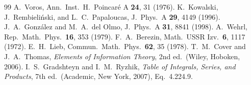 \documentclass[pra,twocolumn,superscriptaddress,longbibliography,floatfix]{revtex4-2}
\begin{document}
\begin{thebibliography}{99}
 A.~Voros, Ann.\ Inst.\ H.\ Poincar\'e A \textbf{24}, 31 (1976).
 K.~Kowalski, J.~Rembieli\'nski, and L.~C.~Papaloucas, J.\ Phys.\ A
\textbf{29}, 4149 (1996).
 J.~A.~Gonz\'alez and M.~A.~del Olmo, J.\ Phys.\ A
\textbf{31}, 8841 (1998).
 A.~Wehrl, Rep.\ Math.\ Phys.\ \textbf{16}, 353 (1979).
 F.~A.~Berezin, Math.\ USSR Izv.\ \textbf{6}, 1117 (1972).
 E.~H.~Lieb, Commun.\ Math.\ Phys.\ \textbf{62}, 35 (1978).
 T.~M.~Cover and J.~A.~Thomas, \emph{Elements of Information
Theory}, 2nd ed.\ (Wiley, Hoboken, 2006).
 I.~S.~Gradshteyn and I.~M.~Ryzhik, \emph{Table of Integrals, Series,
and Products}, 7th ed.\ (Academic, New York, 2007), Eq.~4.224.9.

\end{thebibliography}
\end{document}
